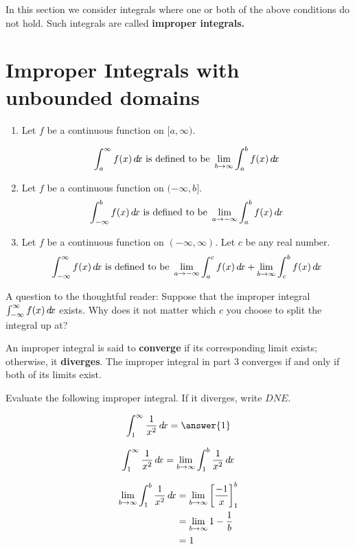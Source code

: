 \documentclass{ximera}
\begin{document}
In this section we consider integrals where one or both of the above conditions do not hold. Such integrals are called \textbf{improper integrals.}

\section{Improper Integrals with unbounded domains}

\begin{definition}

\begin{enumerate}

\item		Let $f$ be a continuous function on $[a,\infty)$.

\[
\int_a^\infty f(x) \mathop{}\!d\! x \text{ is defined to be } \lim_{b\to\infty}\int_a^b f(x) \mathop{}\!d\! x
\]

\item		Let $f$ be a continuous function on $(-\infty,b]$.
\[
\int_{-\infty}^b f(x) \mathop{}\!d\! x \text{ is defined to be } \lim_{a\to-\infty}\int_a^b f(x) \mathop{}\!d\! x
\]

\item		Let $f$ be a continuous function on $(-\infty,\infty)$. Let $c$ be any real number.
\[
\int_{-\infty}^\infty f(x) \mathop{}\!d\! x  \text{ is defined to be } \lim_{a\to-\infty}\int_a^c f(x) \mathop{}\!d\! x  +  \lim_{b\to\infty}\int_c^b f(x) \mathop{}\!d\! x
\]
\end{enumerate}
\end{definition}

A question to the thoughtful reader:  Suppose that the improper integral $\int_{-\infty}^\infty f(x) \mathop{}\!d\! x$ exists.  Why does it not matter which $c$ you choose to split the integral up at?

An improper integral is said to \textbf{converge} if its corresponding limit exists; otherwise, it \textbf{diverges}. The improper integral in part $3$ converges if and only if both of its limits exist.


\begin{example}	
	Evaluate the following improper integral.  If it diverges, write $DNE$.
	
	\[
	\int_1^\infty \frac{1}{x^2} \d x = \answer{1}
	\]
	
	\begin{hint}
		\[
		\int_1^\infty \frac{1}{x^2} \mathop{}\!d\! x = \lim_{b \to \infty} \int_1^b \frac{1}{x^2} \mathop{}\!d\! x
		\]
	\end{hint}
	\begin{hint}
		\begin{align*}
		 \lim_{b \to \infty} \int_1^b \frac{1}{x^2} \mathop{}\!d\! x &=  \lim_{b \to \infty} \bigg[ \frac{-1}{x} \bigg]_1^b \\
		 	&=  \lim_{b \to \infty} 1 - \frac{1}{b}\\
			&= 1
		\end{align*}
	\end{hint}
\end{example}
\end{document}

